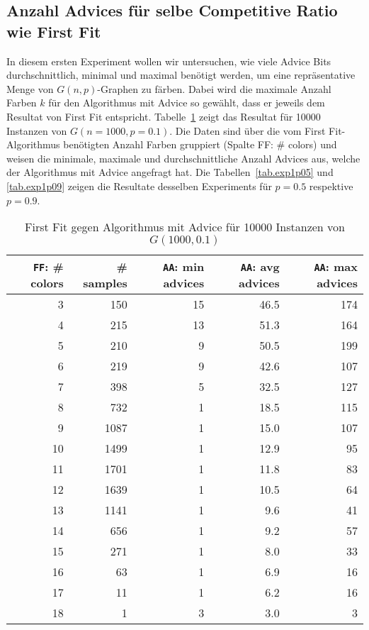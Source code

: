 \documentclass[11pt,abstracton]{scrreprt} %
\theoremstyle{definition}
\begin{document}
\subsection{Anzahl Advices für selbe Competitive Ratio wie First Fit}

In diesem ersten Experiment wollen wir untersuchen, wie viele Advice Bits durchschnittlich, minimal und maximal benötigt werden, um eine repräsentative Menge von $G(n,p)$-Graphen zu färben. Dabei wird die maximale Anzahl Farben $k$ für den Algorithmus mit Advice so gewählt, dass er jeweils dem Resultat von First Fit entspricht. Tabelle~\ref{tab.exp1p01} zeigt das Resultat für 10000 Instanzen von $G(n = 1000, p = 0.1)$. Die Daten sind über die vom First Fit-Algorithmus benötigten Anzahl Farben gruppiert (Spalte FF: \# colors) und weisen die minimale, maximale und durchschnittliche Anzahl Advices aus, welche der Algorithmus mit Advice angefragt hat. Die Tabellen~\ref{tab.exp1p05} und \ref{tab.exp1p09} zeigen die Resultate desselben Experiments für $p = 0.5$ respektive $p = 0.9$.

\begin{table}
\caption{First Fit gegen Algorithmus mit Advice für 10000 Instanzen von $G(1000, 0.1)$}
\label{tab.exp1p01}


  \centering
    \begin{tabular}{rrrrr}
    \toprule
    {\tt{FF}}: \# colors & \# samples & {\tt{AA}}: min advices & {\tt{AA}}: avg advices & {\tt{AA}}: max advices \\
    \midrule
3     & 150   & 15    & 46.5 & 174 \\
4     & 215   & 13    & 51.3 & 164 \\
5     & 210   & 9     & 50.5 & 199 \\
6     & 219   & 9     & 42.6 & 107 \\
7     & 398   & 5     & 32.5 & 127 \\
8     & 732   & 1     & 18.5& 115 \\
9     & 1087  & 1     & 15.0 & 107 \\
10    & 1499  & 1     & 12.9 & 95 \\
11    & 1701  & 1     & 11.8 & 83 \\
12    & 1639  & 1     & 10.5 & 64 \\
13    & 1141  & 1     & 9.6 & 41 \\
14    & 656   & 1     & 9.2 & 57 \\
15    & 271   & 1     & 8.0 & 33 \\
16    & 63    & 1     & 6.9 & 16 \\
17    & 11    & 1     & 6.2 & 16 \\
18    & 1     & 3     & 3.0     & 3 \\
    \bottomrule
    \end{tabular}%

\end{table}
\end{document}
